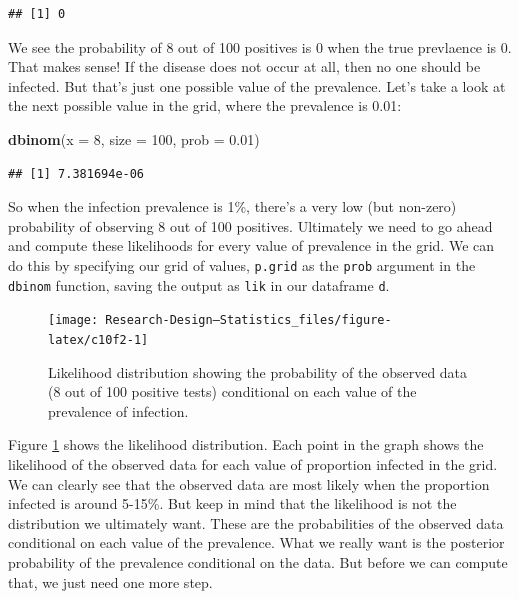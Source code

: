 \documentclass[
]{book}
\newenvironment{Shaded}{\begin{snugshade}}{\end{snugshade}}
\newcommand{\AttributeTok}[1]{\textcolor[rgb]{0.13,0.29,0.53}{#1}}
\newcommand{\DecValTok}[1]{\textcolor[rgb]{0.00,0.00,0.81}{#1}}
\newcommand{\FloatTok}[1]{\textcolor[rgb]{0.00,0.00,0.81}{#1}}
\newcommand{\FunctionTok}[1]{\textcolor[rgb]{0.13,0.29,0.53}{\textbf{#1}}}
\newcommand{\NormalTok}[1]{#1}
\begin{document}
\begin{verbatim}
## [1] 0
\end{verbatim}

We see the probability of 8 out of 100 positives is 0 when the true prevlaence is 0. That makes sense! If the disease does not occur at all, then no one should be infected. But that's just one possible value of the prevalence. Let's take a look at the next possible value in the grid, where the prevalence is 0.01:

\begin{Shaded}
\begin{Highlighting}[]
\FunctionTok{dbinom}\NormalTok{(}\AttributeTok{x =} \DecValTok{8}\NormalTok{, }\AttributeTok{size =} \DecValTok{100}\NormalTok{, }\AttributeTok{prob =} \FloatTok{0.01}\NormalTok{)}
\end{Highlighting}
\end{Shaded}

\begin{verbatim}
## [1] 7.381694e-06
\end{verbatim}

So when the infection prevalence is 1\%, there's a very low (but non-zero) probability of observing 8 out of 100 positives. Ultimately we need to go ahead and compute these likelihoods for every value of prevalence in the grid. We can do this by specifying our grid of values, \texttt{p.grid} as the \texttt{prob} argument in the \texttt{dbinom} function, saving the output as \texttt{lik} in our dataframe \texttt{d}.

\begin{figure}

{\centering \texttt{[image: Research-Design---Statistics\_files/figure-latex/c10f2-1]} 

}

\caption{Likelihood distribution showing the probability of the observed data (8 out of 100 positive tests) conditional on each value of the prevalence of infection.}\label{fig:c10f2}
\end{figure}

Figure \ref{fig:c10f2} shows the likelihood distribution. Each point in the graph shows the likelihood of the observed data for each value of proportion infected in the grid. We can clearly see that the observed data are most likely when the proportion infected is around 5-15\%. But keep in mind that the likelihood is not the distribution we ultimately want. These are the probabilities of the observed data conditional on each value of the prevalence. What we really want is the posterior probability of the prevalence conditional on the data. But before we can compute that, we just need one more step.
\end{document}
